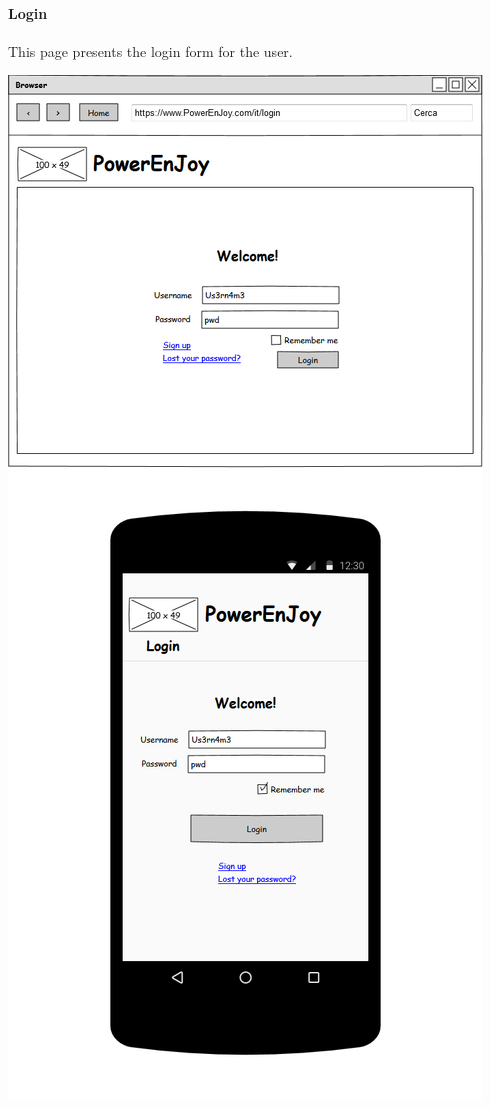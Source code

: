 \paragraph{Login} This page presents the login form for the user.
\begin{center}
	\includegraphics[width=0.6\linewidth]{"img/ui/login"}
\end{center}
\pagebreak

